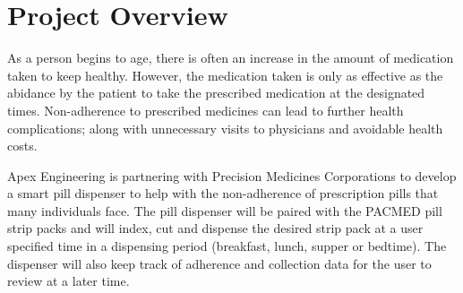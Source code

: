 \documentclass[12pt]{article}
\begin{document}
 
\pagebreak
\pagestyle{fancy} \fancyhf{}
  \cfoot{\thepage}


\pagebreak
\tableofcontents
\pagebreak
{}


\section{Project Overview}
As a person begins to age, there is often an increase in the amount of medication taken to keep healthy. However, the medication taken is only as effective as the abidance by the patient to take the prescribed medication at the designated times. Non-adherence to prescribed medicines can lead to further health complications; along with unnecessary visits to physicians and avoidable health costs. 

Apex Engineering is partnering with Precision Medicines Corporations to develop a smart pill dispenser to help with the non-adherence of prescription pills that many individuals face. The pill dispenser will be paired with the PACMED pill strip packs and will index, cut and dispense the desired strip pack at a user specified time in a dispensing period (breakfast, lunch, supper or bedtime). The dispenser will also keep track of adherence and collection data for the user to review at a later time.  
\end{document}
